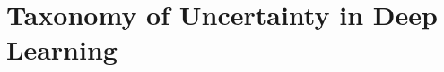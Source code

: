 %
%
%
%
%
%
%


\chapter{Taxonomy of Uncertainty in Deep Learning}
\label{chapter:deepuncertainty}


